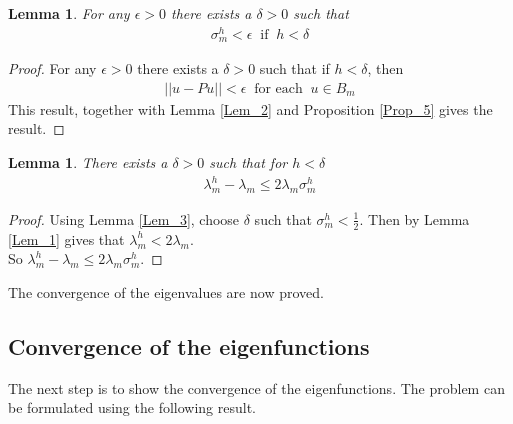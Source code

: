 \documentclass[../../main.tex]{subfiles}
\begin{document}
\newtheorem{Lem_3}[Lem_1]{Lemma} \label{Lem_3}
\begin{Lem_3}
	For any $\epsilon >0$ there exists a $\delta > 0$ such that
	\begin{eqnarray*}
	\sigma_{m}^{h} < \epsilon \ \textrm{ if } \ h < \delta
	\end{eqnarray*}
\end{Lem_3}
\begin{proof}
	For any $\epsilon > 0$ there exists a $\delta > 0$ such that if $h<\delta$, then
	\begin{eqnarray*}
	||u-Pu|| < \epsilon \ \textrm{ for each } \ u \in B_{m}
	\end{eqnarray*}
	This result, together with Lemma \ref{Lem_2} and Proposition \ref{Prop_5} gives the result.
\end{proof}

\newtheorem{Lem_4}[Lem_1]{Lemma} \label{Lem_4}
\begin{Lem_4}
	There exists a $\delta > 0$ such that for $h < \delta$
	\begin{eqnarray*}
	\lambda_{m}^{h} - \lambda_{m} \leq 2\lambda_{m}\sigma_{m}^{h}
	\end{eqnarray*}
\end{Lem_4}
\begin{proof}
	Using Lemma \ref{Lem_3}, choose $\delta$ such that $\sigma_{m}^{h} < \frac{1}{2}$. Then by Lemma \ref{Lem_1} gives that $\lambda_{m}^{h} < 2\lambda_{m}$.\\
	
	So $\lambda_{m}^{h} - \lambda_{m} \leq 2\lambda_{m}\sigma_{m}^{h}$.
\end{proof}

The convergence of the eigenvalues are now proved.

\subsection{Convergence of the eigenfunctions}
The next step is to show the convergence of the eigenfunctions. The problem can be formulated using the following result.
\end{document}
